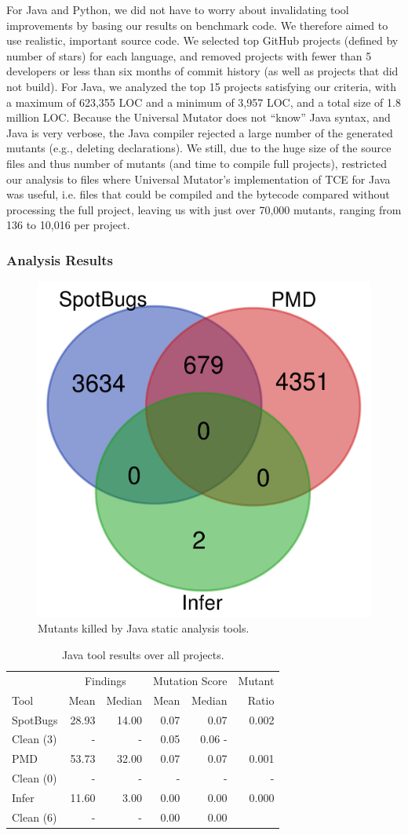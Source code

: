 For Java and Python, we did not have to worry about invalidating tool improvements by basing our results on benchmark code.  We therefore aimed to use realistic, important source code.  We selected top GitHub projects (defined by number of stars) for each language, and removed projects with fewer than 5 developers or less than six months of commit history (as well as projects that did not build).  For Java, we analyzed the top 15 projects satisfying our criteria, with a maximum of 623,355 LOC and a minimum of 3,957 LOC, and a total size of 1.8 million LOC.  Because the Universal Mutator does not ``know'' Java syntax, and Java is very verbose, the Java compiler rejected a large number of the generated mutants (e.g., deleting declarations).  We still, due to the huge size of the source files and thus number of mutants (and time to compile full projects), restricted our analysis to files where Universal Mutator's implementation of TCE \cite{TCE} for Java was useful, i.e. files that could be compiled and the bytecode compared without processing the full project, leaving us with just over 70,000 mutants, ranging from 136 to 10,016 per project.

\subsubsection{Analysis Results}


\begin{figure}
  \centering
  \includegraphics[width=0.35\columnwidth]{java.png}
  \caption{Mutants killed by Java static analysis tools.}
  \label{fig:javavenn}
\end{figure}

\begin{table}
  \begin{tabular}{l|r|r|r|r|r}
    & \multicolumn{2}{|c|}{Findings} & \multicolumn{2}{|c|}{Mutation Score}  & Mutant \\
    Tool & Mean & Median & Mean & Median & Ratio\\
    \hline
    \hline
    SpotBugs & 28.93 & 14.00 & 0.07 & 0.07 & 0.002 \\
    Clean (3) & - & - & 0.05 & 0.06 - \\
    \hline
    PMD & 53.73 & 32.00 & 0.07 & 0.07 & 0.001 \\
    Clean (0) & - & - & - & - & - \\
    \hline
    Infer & 11.60 & 3.00 & 0.00 & 0.00 &  0.000 \\
    Clean (6) & - & - & 0.00 & 0.00 \\
    \hline
  \end{tabular}
  \caption{Java tool results over all projects.}
  \label{tab:scorejava}
\end{table}



